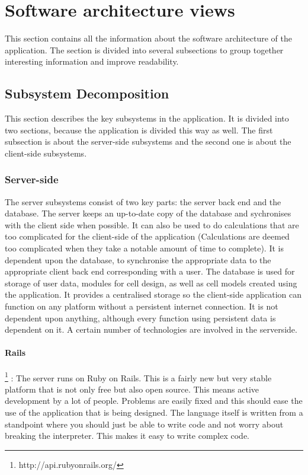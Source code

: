 \documentclass{report}
\begin{document}
			
	\clearpage
	\section{Software architecture views}
		This section contains all the information about the software architecture of the application. The section is divided into several subsections to group together interesting information and improve readability.
		\subsection{Subsystem Decomposition}
			This section describes the key subsystems in the application. It is divided into two sections, because the application is divided this way as well. The first subsection is about the server-side subsystems and the second one is about the client-side subsystems.
			\subsubsection{Server-side}
				The server subsystems consist of two key parts: the server back end and the database. The server keeps an up-to-date copy of the database and sychronises with the client side when possible. It can also be used to do calculations that are too complicated for the client-side of the application (Calculations are deemed too complicated when they take a notable amount of time to complete). It is dependent upon the database, to synchronise the appropriate data to the appropriate client back end corresponding with a user.
				The database is used for storage of user data, modules for cell design, as well as cell models created using the application. It provides a centralised storage so the client-side application can function on any platform without a persistent internet connection. It is not dependent upon anything, although every function using persistent data is dependent on it. 
				A certain number of technologies are involved in the serverside.
				\paragraph{Rails}\footnote{http://api.rubyonrails.org/}
					: The server runs on Ruby on Rails. This is a fairly new but very stable platform that is not only free but also open source. This means active development by a lot of people. Problems are easily fixed and this should ease the use of the application that is being designed. The language itself is written from a standpoint where you should just be able to write code and not worry about breaking the interpreter. This makes it easy to write complex code.
\end{document}
